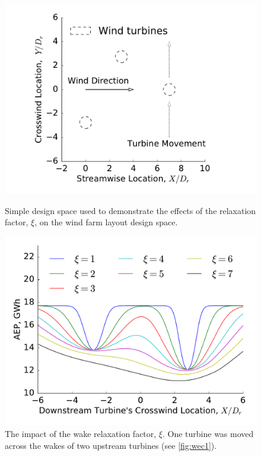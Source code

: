 	\begin{figure}
		\centering
		\begin{minipage}{.43\textwidth}
		  \centering
		  \captionsetup{width=0.77\textwidth}
		  \includegraphics[width=\textwidth]{./figures/thomas-wec1.pdf}
		  \caption{Simple design space used to
		  	demonstrate the effects of the relaxation
			factor, $\xi$, on the wind farm layout design space. \cite{ThomasNing2018}}
		  \label{fig:wec1}
		\end{minipage}%
		\begin{minipage}{.5\textwidth}
		  \centering
		  \captionsetup{width=0.94\textwidth}
		  \includegraphics[width=\textwidth]{./figures/thomas-wec2.pdf}
		  \caption{The impact of the wake relaxation factor, $\xi$.
		  One turbine was moved across the wakes of two upstream turbines (see \cref{fig:wec1}). \cite{ThomasNing2018}}
		  \label{fig:wec2}
		\end{minipage}
	\end{figure}

